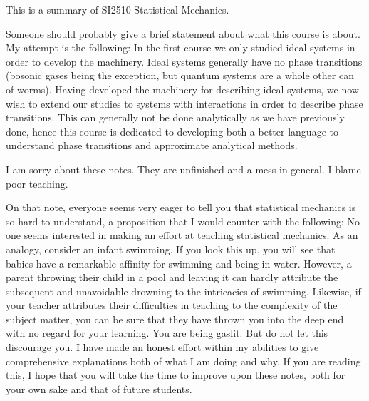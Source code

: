 This is a summary of SI2510 Statistical Mechanics.

Someone should probably give a brief statement about what this course is about. My attempt is the following: In the first course we only studied ideal systems in order to develop the machinery. Ideal systems generally have no phase transitions (bosonic gases being the exception, but quantum systems are a whole other can of worms). Having developed the machinery for describing ideal systems, we now wish to extend our studies to systems with interactions in order to describe phase transitions. This can generally not be done analytically as we have previously done, hence this course is dedicated to developing both a better language to understand phase transitions and approximate analytical methods.

I am sorry about these notes. They are unfinished and a mess in general. I blame poor teaching.

On that note, everyone seems very eager to tell you that statistical mechanics is so hard to understand, a proposition that I would counter with the following: No one seems interested in making an effort at teaching statistical mechanics. As an analogy, consider an infant swimming. If you look this up, you will see that babies have a remarkable affinity for swimming and being in water. However, a parent throwing their child in a pool and leaving it can hardly attribute the subsequent and unavoidable drowning to the intricacies of swimming. Likewise, if your teacher attributes their difficulties in teaching to the complexity of the subject matter, you can be sure that they have thrown you into the deep end with no regard for your learning. You are being gaslit. But do not let this discourage you. I have made an honest effort within my abilities to give comprehensive explanations both of what I am doing and why. If you are reading this, I hope that you will take the time to improve upon these notes, both for your own sake and that of future students.